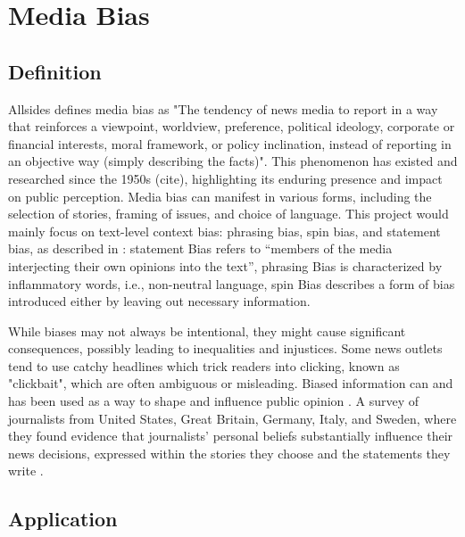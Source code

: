 \chapter{Media Bias}
\label{cha:2}

\section{Definition}

Allsides \cite{allsides-2022-bias-definition} defines media bias as "The tendency of news media to report in a way that reinforces a viewpoint, worldview, preference, political ideology, corporate or financial interests, moral framework, or policy inclination, instead of reporting in an objective way (simply describing the facts)". This phenomenon has existed and researched since the 1950s (cite), highlighting its enduring presence and impact on public perception. Media bias can manifest in various forms, including the selection of stories, framing of issues, and choice of language. This project would mainly focus on text-level context bias: phrasing bias, spin bias, and statement bias, as described in \cite{spinde-2024-taxonomy}: statement Bias refers to “members of the media interjecting their own opinions into the text”, phrasing Bias is characterized by inflammatory words, i.e., non-neutral language, spin Bias describes a form of bias introduced either by leaving out necessary information.

While biases may not always be intentional, they might cause significant consequences, possibly leading to inequalities and injustices. Some news outlets tend to use catchy headlines which trick readers into clicking, known as "clickbait", which are often ambiguous or misleading. Biased information can and has been used as a way to shape and influence public opinion \cite{aires-2020-information}. A survey of journalists from United States, Great Britain, Germany, Italy, and Sweden, where they found evidence that journalists' personal beliefs substantially influence their news decisions, expressed within the stories they choose and the statements they write \cite{patterson-donsbach-1996-news-decisions}.

\section{Application}

